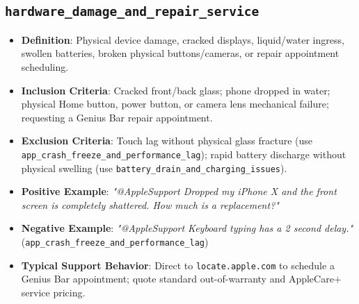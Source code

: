 \documentclass[11pt,a4paper]{article}
\begin{document}
\subsection{\texttt{hardware\_damage\_and\_repair\_service}}
\begin{itemize}[leftmargin=*]
    \item \textbf{Definition}: Physical device damage, cracked displays, liquid/water ingress, swollen batteries, broken physical buttons/cameras, or repair appointment scheduling.
    \item \textbf{Inclusion Criteria}: Cracked front/back glass; phone dropped in water; physical Home button, power button, or camera lens mechanical failure; requesting a Genius Bar repair appointment.
    \item \textbf{Exclusion Criteria}: Touch lag without physical glass fracture (use \texttt{app\_crash\_freeze\_and\_performance\_lag}); rapid battery discharge without physical swelling (use \texttt{battery\_drain\_and\_charging\_issues}).
    \item \textbf{Positive Example}: \textit{"@AppleSupport Dropped my iPhone X and the front screen is completely shattered. How much is a replacement?"}
    \item \textbf{Negative Example}: \textit{"@AppleSupport Keyboard typing has a 2 second delay."} (\texttt{app\_crash\_freeze\_and\_performance\_lag})
    \item \textbf{Typical Support Behavior}: Direct to \texttt{locate.apple.com} to schedule a Genius Bar appointment; quote standard out-of-warranty and AppleCare+ service pricing.
\end{itemize}
\end{document}
